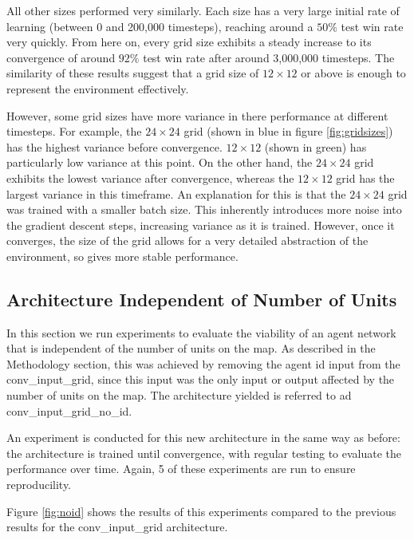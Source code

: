 All other sizes performed very similarly. Each size has a very large initial rate of learning (between 0 and 200,000 timesteps), reaching around a $50\%$ test win rate very quickly. From here on, every grid size exhibits a steady increase to its convergence of around $92\%$ test win rate after around 3,000,000 timesteps. The similarity of these results suggest that a grid size of $12 \times 12$ or above is enough to represent the environment effectively.

However, some grid sizes have more variance in there performance at different timesteps. For example, the $24 \times 24$ grid (shown in blue in figure \ref{fig:gridsizes}) has the highest variance before convergence. $12 \times 12$ (shown in green) has particularly low variance at this point. On the other hand, the $24 \times 24$ grid exhibits the lowest variance after convergence, whereas the $12 \times 12$ grid has the largest variance in this timeframe. An explanation for this is that the $24 \times 24$ grid was trained with a smaller batch size. This inherently introduces more noise into the gradient descent steps, increasing variance as it is trained. However, once it converges, the size of the grid allows for a very detailed abstraction of the environment, so gives more stable performance.

\subsection{Architecture Independent of Number of Units}
In this section we run experiments to evaluate the viability of an agent network that is independent of the number of units on the map. As described in the Methodology section, this was achieved by removing the agent id input from the conv\_input\_grid, since this input was the only input or output affected by the number of units on the map. The architecture yielded is referred to ad conv\_input\_grid\_no\_id.


An experiment is conducted for this new architecture in the same way as before: the architecture is trained until convergence, with regular testing to evaluate the performance over time. Again, 5 of these experiments are run to ensure reproducility.

Figure \ref{fig:noid} shows the results of this experiments compared to the previous results for the conv\_input\_grid architecture.

